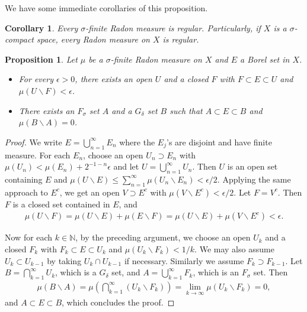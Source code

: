 \documentclass{article}
\numberwithin{equation}{section}
\newcommand{\bbN}{\mathbb{N}}
\theoremstyle{plain}
\newtheorem{proposition}[theorem]{Proposition}
\newtheorem{corollary}[theorem]{Corollary}
\theoremstyle{definition}
\begin{document}
We have some immediate corollaries of this proposition.
\begin{corollary}
	Every $\sigma$-finite Radon measure is regular. Particularly, if $X$ is a $\sigma$-compact space, every Radon measure on $X$ is regular.
\end{corollary}
\begin{proposition}\label{sandwichapprox}
	Let $\mu$ be a $\sigma$-finite Radon measure on $X$ and $E$ a Borel set in $X$.
	\begin{itemize}
		\item[(i)] For every $\epsilon>0$, there exists an open $U$ and a closed $F$ with $F\subset E\subset U$ and $\mu(U\backslash F)<\epsilon$.
		\item[(ii)] There exists an $F_\sigma$ set $A$ and a $G_\delta$ set $B$ such that $A\subset E\subset B$ and $\mu(B\backslash A)=0$.
	\end{itemize}
\end{proposition}
\begin{proof}
	We write $E=\bigcup_{n=1}^\infty E_n$ where the $E_j$'s are disjoint and have finite measure. For each $E_n$, choose an open $U_n\supset E_n$ with $\mu(U_n)<\mu(E_n)+2^{-1-n}\epsilon$ and let $U=\bigcup_{n=1}^\infty U_n$. Then $U$ is an open set containing $E$ and $\mu(U\backslash E)\leq\sum_{n=1}^\infty\mu(U_n\backslash E_n)<\epsilon/2$. Applying the same approach to $E^c$, we get an open $V\supset E^c$ with $\mu(V\backslash E^c)<\epsilon/2$. Let $F=V^c$. Then $F$ is a closed set contained in $E$, and
	\begin{align*}
		\mu(U\backslash F)=\mu(U\backslash E)+\mu(E\backslash F)=\mu(U\backslash E)+\mu(V\backslash E^c)<\epsilon.
	\end{align*}
	
	Now for each $k\in\bbN$, by the preceding argument, we choose an open $U_k$ and a closed $F_k$ with $F_k\subset E\subset U_k$ and $\mu(U_k\backslash F_k)<1/k$. We may also assume $U_k\subset U_{k-1}$ by taking $U_k\cap U_{k-1}$ if necessary. Similarly we assume $F_k\supset F_{k-1}$. Let $B=\bigcap_{k=1}^\infty U_k$, which is a $G_\delta$ set, and $A=\bigcup_{k=1}^\infty F_k$, which is an $F_\sigma$ set. Then
	\begin{align*}
		\mu(B\backslash A)=\mu\left(\bigcap_{k=1}^\infty(U_k\backslash F_k)\right)=\lim_{k\to\infty}\mu(U_k\backslash F_k)=0,
	\end{align*}
	and $A\subset E\subset B$, which concludes the proof.
\end{proof}
\end{document}
